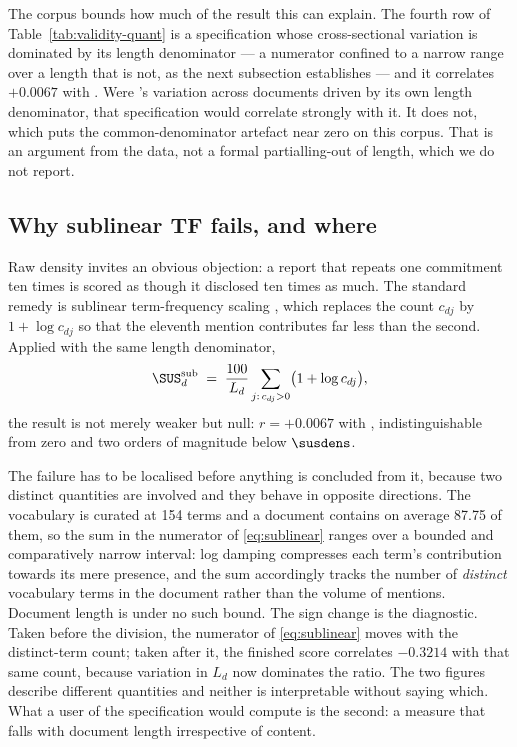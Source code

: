 The corpus bounds how much of the result this can explain. The fourth row of
Table~\ref{tab:validity-quant} is a specification whose cross-sectional variation is
dominated by its length denominator --- a numerator confined to a narrow range over a length
that is not, as the next subsection establishes --- and it correlates $+0.0067$ with
\QUANT{}. Were \QUANT{}'s variation across
documents driven by its own length denominator, that specification would correlate strongly
with it. It does not, which puts the common-denominator artefact near zero on this corpus.
That is an argument from the data, not a formal partialling-out of length, which we do not
report.

\subsection{Why sublinear TF fails, and where}

Raw density invites an obvious objection: a report that repeats one commitment ten times
is scored as though it disclosed ten times as much. The standard remedy is sublinear
term-frequency scaling \citep{manning2008}, which replaces the count $c_{dj}$ by
$1 + \log c_{dj}$ so that the eleventh mention contributes far less than the second.
Applied with the same length denominator,
\begin{equation}
\label{eq:sublinear}
\SUS^{\mathrm{sub}}_d \;=\; \frac{100}{L_d}\sum_{j:\,c_{dj}>0}\bigl(1+\log c_{dj}\bigr),
\end{equation}
the result is not merely weaker but null: $r = +0.0067$ with \QUANT{}, indistinguishable
from zero and two orders of magnitude below $\susdens$.

The failure has to be localised before anything is concluded from it, because two distinct
quantities are involved and they behave in opposite directions. The vocabulary is curated at
154 terms and a document contains on average 87.75 of them, so the sum in the numerator of
\eqref{eq:sublinear} ranges over a bounded and comparatively narrow interval: log damping
compresses each term's contribution towards its mere presence, and the sum accordingly
tracks the number of \emph{distinct} vocabulary terms in the document rather than the volume
of mentions. Document length is under no such bound. The sign change is the diagnostic.
Taken before the division, the numerator of \eqref{eq:sublinear} moves with the
distinct-term count; taken after it, the finished score correlates $-0.3214$ with that same
count, because variation in $L_d$ now dominates the ratio. The two figures describe
different quantities and neither is interpretable without saying which. What a user of the
specification would compute is the second: a measure that falls with document length
irrespective of content.


